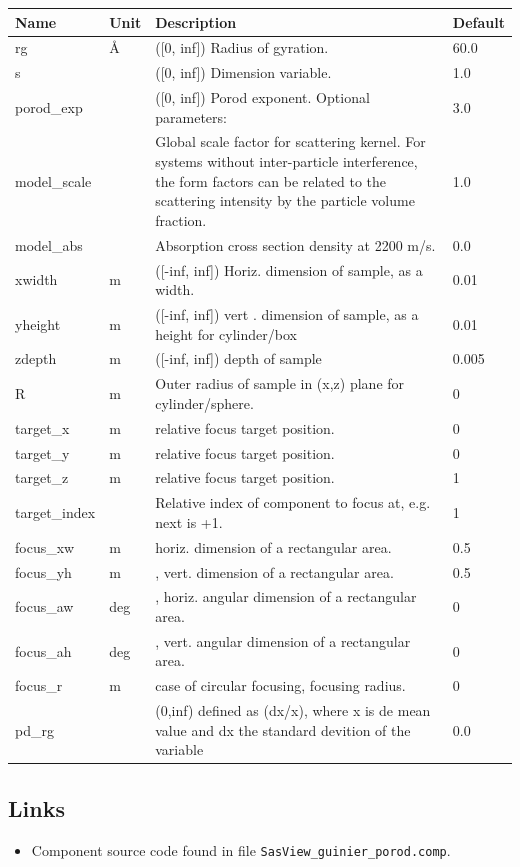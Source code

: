 \begin{longtable}{p{}p{}p{}p{}}
\toprule
\textbf{Name} & \textbf{Unit} & \textbf{Description} & \textbf{Default} \\
\midrule
\endhead
rg & \AA{} & ([0, inf]) Radius of gyration. & 60.0 \\
s &  & ([0, inf]) Dimension variable. & 1.0 \\
porod\_exp &  & ([0, inf]) Porod exponent. Optional parameters: & 3.0 \\
model\_scale &   & Global scale factor for scattering kernel. For systems without inter-particle interference, the form factors can be related to the scattering intensity by the particle volume fraction. & 1.0 \\
model\_abs &   & Absorption cross section density at 2200 m/s. & 0.0 \\
xwidth & m & ([-inf, inf]) Horiz. dimension of sample, as a width. & 0.01 \\
yheight & m & ([-inf, inf]) vert . dimension of sample, as a height for cylinder/box & 0.01 \\
zdepth & m & ([-inf, inf]) depth of sample & 0.005 \\
R & m & Outer radius of sample in (x,z) plane for cylinder/sphere. & 0 \\
target\_x & m & relative focus target position. & 0 \\
target\_y & m & relative focus target position. & 0 \\
target\_z & m & relative focus target position. & 1 \\
target\_index &   & Relative index of component to focus at, e.g. next is +1. & 1 \\
focus\_xw & m & horiz. dimension of a rectangular area. & 0.5 \\
focus\_yh & m & , vert. dimension of a rectangular area. & 0.5 \\
focus\_aw & deg & , horiz. angular dimension of a rectangular area. & 0 \\
focus\_ah & deg & , vert. angular dimension of a rectangular area. & 0 \\
focus\_r & m & case of circular focusing, focusing radius. & 0 \\
pd\_rg &  & (0,inf) defined as (dx/x), where x is de mean value and dx the standard devition of the variable & 0.0 \\
\bottomrule
\end{longtable}

\subsection*{Links}
\begin{itemize}
  \item Component source code found in file \texttt{SasView\_guinier\_porod.comp}.
\end{itemize}
